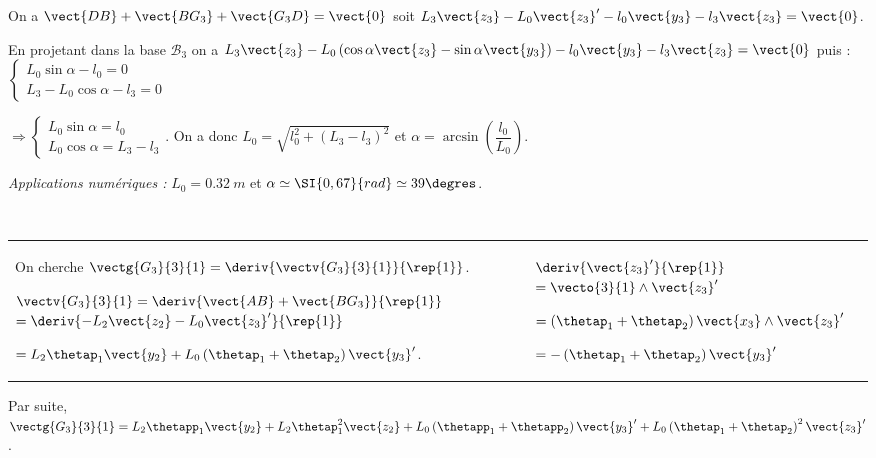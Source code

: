 

\ifprof\begin{corrige}
On a $\vect{DB}+\vect{BG_3}+\vect{G_3D} = \vect{0}$ soit $L_3\vect{z_3}-L_0\vect{z_3}'-l_0\vect{y_3}-l_3\vect{z_3} = \vect{0}$. 

En projetant dans la base $\mathcal{B}_3$ on a 
$L_3\vect{z_3}-L_0\left(\cos\alpha \vect{z_3} - \sin\alpha \vect{y_3} \right)-l_0\vect{y_3}-l_3\vect{z_3} = \vect{0}$ puis : 
$
\left\{ \begin{array}{l}
L_0 \sin\alpha -l_0 = 0 \\
L_3-L_0 \cos\alpha -l_3 = 0
\end{array}
\right.
$

$
\Rightarrow 
\left\{ \begin{array}{l}
L_0 \sin\alpha = l_0  \\
L_0 \cos\alpha  = L_3 - l_3 
\end{array}
\right.
$.
On a donc $L_0 =\sqrt{l_0 ^2 + \left(L_3- l_3\right)^2}$ et $\alpha = \arcsin \left(\dfrac{l_0}{L_0}\right)$.

\textit{Applications numériques : } $L_0= \SI{0,32}{m}$ et $\alpha \simeq \SI{0,67}{rad} \simeq 39\degres$.

\end{corrige}\else\fi


\ifprof\begin{corrige}~\\

\begin{tabular}{p{.68\linewidth}| p{.3\linewidth}}
On cherche $\vectg{G_3}{3}{1} = \deriv{\vectv{G_3}{3}{1}}{\rep{1}}$.

$\vectv{G_3}{3}{1} = \deriv{\vect{AB}+\vect{BG_3}}{\rep{1}}$
$= \deriv{-L_2 \vect{z_2} -L_0 \vect{z_3}'}{\rep{1}}$

$=L_2 \thetap_1\vect{y_2}  +L_0  \left(\thetap_1 + \thetap_2 \right)\vect{y_3}'$.
&
$\deriv{\vect{z_3}'}{\rep{1}} $ $=\vecto{3}{1}\wedge \vect{z_3}' $

$= \left(\thetap_1 + \thetap_2 \right)\vect{x_3} \wedge \vect{z_3}' $

$= - \left(\thetap_1 + \thetap_2 \right)\vect{y_3}' $ 
\\
\end{tabular}

Par suite, 
$\vectg{G_3}{3}{1} = L_2 \thetapp_1\vect{y_2}  +L_2 \thetap_1^2\vect{z_2}  + L_0  \left(\thetapp_1 + \thetapp_2 \right)\vect{y_3}'+ L_0  \left(\thetap_1 + \thetap_2 \right)^2\vect{z_3}'$.


\end{corrige}\else\fi


